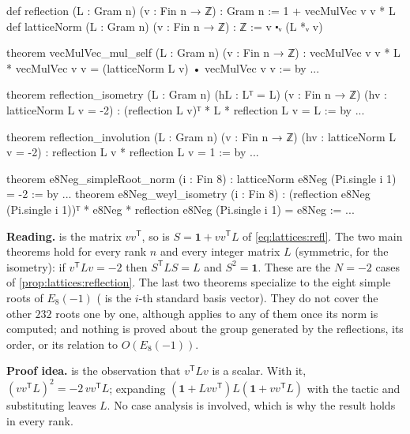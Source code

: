 \begin{leanbox}
\begin{leancode}
def reflection (L : Gram n) (v : Fin n → ℤ) : Gram n :=
  1 + vecMulVec v v * L
def latticeNorm (L : Gram n) (v : Fin n → ℤ) : ℤ := v ⬝ᵥ (L *ᵥ v)

theorem vecMulVec_mul_self (L : Gram n) (v : Fin n → ℤ) :
    vecMulVec v v * L * vecMulVec v v
      = (latticeNorm L v) • vecMulVec v v := by ...

theorem reflection_isometry (L : Gram n) (hL : Lᵀ = L) (v : Fin n → ℤ)
    (hv : latticeNorm L v = -2) :
    (reflection L v)ᵀ * L * reflection L v = L := by ...

theorem reflection_involution (L : Gram n) (v : Fin n → ℤ)
    (hv : latticeNorm L v = -2) :
    reflection L v * reflection L v = 1 := by ...

theorem e8Neg_simpleRoot_norm (i : Fin 8) :
    latticeNorm e8Neg (Pi.single i 1) = -2 := by ...
theorem e8Neg_weyl_isometry (i : Fin 8) :
    (reflection e8Neg (Pi.single i 1))ᵀ * e8Neg
      * reflection e8Neg (Pi.single i 1) = e8Neg := ...
\end{leancode}
\textbf{Reading.}  is the matrix $vv^{\mathsf T}$, so 
is $S=\mathbf1+vv^{\mathsf T}L$ of \eqref{eq:lattices:refl}. The two main theorems hold for
every rank $n$ and every integer matrix $L$ (symmetric, for the isometry): if
$v^{\mathsf T}Lv=-2$ then $S^{\mathsf T}LS=L$ and $S^2=\mathbf1$. These are the $N=-2$ cases
of \cref{prop:lattices:reflection}. The last two theorems specialize to the eight simple
roots of $E_8(-1)$ ( is the $i$-th standard basis vector). They do not
cover the other $232$ roots one by one, although  applies to any
of them once its norm is computed; and nothing is proved about the group generated by the
reflections, its order, or its relation to $O(E_8(-1))$.

\textbf{Proof idea.}  is the observation that
$v^{\mathsf T}Lv$ is a scalar. With it, $(vv^{\mathsf T}L)^2=-2\,vv^{\mathsf T}L$; expanding
$(\mathbf1+Lvv^{\mathsf T})L(\mathbf1+vv^{\mathsf T}L)$ with the tactic
 and substituting leaves $L$. No case analysis is involved, which is why
the result holds in every rank.
\end{leanbox}

